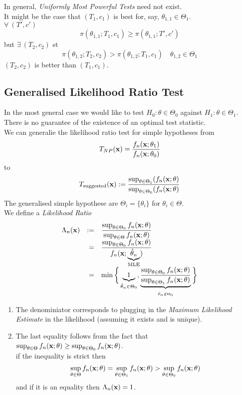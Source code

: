 \documentclass[11pt,a4paper]{article}
\begin{document}
In general, \textit{Uniformly Most Powerful Tests} need not exist.\\
It might be the case that $(T_1,c_1)$ is best for, say, $\theta_{1,1}\in\Theta_1$.\\
\ie $\forall\ (T',c')$
$$\pi(\theta_{1,1};T_1,c_1)\geq\pi(\theta_{1,1};T',c')$$
but $\exists\ (T_2,c_2)$ st
$$\pi(\theta_{1,2};T_2,c_2)>\pi(\theta_{1,2};T_1,c_1)\quad\theta_{1,2}\in\Theta_1$$
\ie $(T_2,c_2)$ is better than $(T_1,c_1)$.\\

\subsection{Generalised Likelihood Ratio Test}

In the most general case we would like to test $H_0:\theta\in\Theta_0$ against $H_1:\theta\in\Theta_1$.\\
There is no guarantee of the existence of an optimal test statistic.\\

We can generalie the likelihood ratio test for simple hypotheses from
$$T_{NP}(\textbf{x})=\frac{f_n(\textbf{x};\theta_1)}{f_n(\textbf{x};\theta_0)}$$
to
$$T_\text{suggested}(\textbf{x}):=\frac{\sup_{\theta\in\Theta_1}(f_n(\textbf{x};\theta)}{\sup_{\theta\in\Theta_0}(f_n(\textbf{x};\theta)}$$
\nb The  generalised simple hypothese are $\Theta_i=\{\theta_i\}$ for $\theta_i\in\Theta$.\\

We define a \textit{Likelihood Ratio}
\[\begin{array}{rrl}
\Lambda_n(\textbf{x})&:=&{\displaystyle\frac{\sup_{\theta\in\Theta_0}f_n(\textbf{x};\theta)}{\sup_{\theta\in\Theta}f_n(\textbf{x};\theta)}}\\
&=&{\displaystyle\frac{\sup_{\theta\in\Theta_0}f_n(\textbf{x};\theta)}{f_n(\textbf{x};\underbrace{\hat\theta_n}_\text{MLE})}}\\
&=&{\displaystyle\min\bigg\{\underbrace{1}_{\hat\theta_n\in\Theta_0},\underbrace{\frac{\sup_{\theta\in\Theta_0}f_n(\textbf{x};\theta)}{\sup_{\theta\in\Theta_1}f_n(\textbf{x};\theta)}}_{_{\hat\theta_n\not\in\Theta_0}}\bigg\}}
\end{array}\]

\begin{enumerate}[label=\roman*)]
	\item The denominiator corresponds to plugging in the \textit{Maximum Likelihood Estimate} in the likelihood (assuming it exists and is unique).
	\item The last equality follows from the fact that $\sup_{\theta\in\Theta}f_n(\textbf{x};\theta)\geq\sup_{\theta\in\Theta_0}f_n(\textbf{x};\theta)$.\\
	if the inequality is strict then
	$$\sup_{\theta\in\Theta}f_n(\textbf{x};\theta)=\sup_{\theta\in\Theta_1}f_n(\textbf{x};\theta)>\sup_{\theta\in\Theta_0}f_n(\textbf{x};\theta)$$
	and if it is an equality then $\Lambda_n(\textbf{x})=1$.
\end{enumerate}
\end{document}
